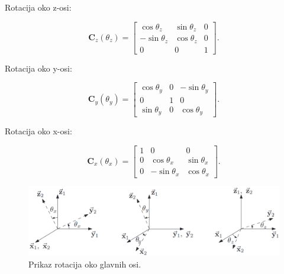 \documentclass[times, utf8, diplomski, numeric]{templates/template}
\begin{document}
{{{{                Rotacija oko z-osi:

                \begin{equation}
                \label{eq:principal_rot_z}
                \boldsymbol{C}_{z}(\theta_{z}) = 
                \begin{bmatrix}
                    \cos\theta_{z}   & \sin\theta_{z}    &  0 \\
                    -\sin\theta_{z}  & \cos\theta_{z}    &  0 \\
                    0                & 0                 &  1
                \end{bmatrix}
                .
                \end{equation}

                Rotacija oko y-osi:

                \begin{equation}
                \label{eq:principal_rot_y}
                \boldsymbol{C}_{y}(\theta_{y}) = 
                \begin{bmatrix}
                    \cos\theta_{y}   &    0    &  -\sin\theta_{y} \\
                    0                &    1    &  0               \\
                    \sin\theta_{y}   &    0    &  \cos\theta_{y}
                \end{bmatrix}
                .
                \end{equation}

                Rotacija oko x-osi:

                \begin{equation}
                \label{eq:principal_rot_x}
                \boldsymbol{C}_{x}(\theta_{x}) = 
                \begin{bmatrix}
                    1    &      0           &  0 \\
                    0    & \cos\theta_{x}   &  \sin\theta_{x} \\
                    0    & -\sin\theta_{x}  &  \cos\theta_{x}
                \end{bmatrix}
                .
                \end{equation}

                \begin{figure}[htb]
                \centering
                \includegraphics[width=1.0\textwidth]{images/principal_rotations.png}
                \caption{Prikaz rotacija oko glavnih osi.}
                \label{fig:principal_rotations}
                \end{figure}
            }

}}}
\end{document}
